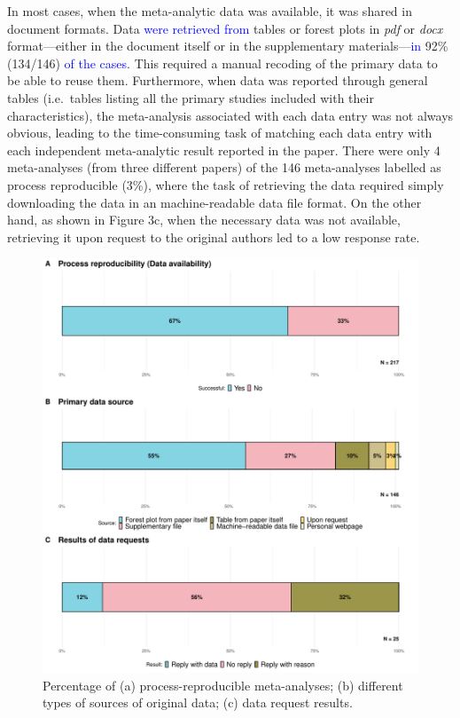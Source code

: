 \documentclass[
  ,man,floatsintext]{apa6}
\begin{document}
In most cases, when the meta-analytic data was available, it was shared in document formats. Data \textcolor{blue}{were retrieved from} tables or forest plots in \emph{pdf} or \emph{docx} format---either in the document itself or in the supplementary materials---\textcolor{blue}{in} 92\% (134/146) \textcolor{blue}{of the cases}. This required a manual recoding of the primary data to be able to reuse them. Furthermore, when data was reported through general tables (i.e.~tables listing all the primary studies included with their characteristics), the meta-analysis associated with each data entry was not always obvious, leading to the time-consuming task of matching each data entry with each independent meta-analytic result reported in the paper. There were only 4 meta-analyses (from three different papers) of the 146 meta-analyses labelled as process reproducible (3\%), where the task of retrieving the data required simply downloading the data in an machine-readable data file format.
On the other hand, as shown in Figure 3c, when the necessary data was not available, retrieving it upon request to the original authors led to a low response rate.

\begin{figure}
\centering
\includegraphics{submission_files/figure-latex/unnamed-chunk-3-1.pdf}
\caption{\label{fig:unnamed-chunk-3}Percentage of (a) process-reproducible meta-analyses; (b) different types of sources of original data; (c) data request results.}
\end{figure}
\end{document}
